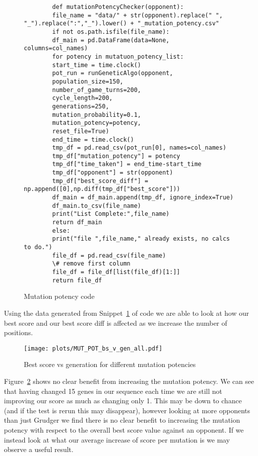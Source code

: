 \begin{figure}
    \begin{verbatim}
        def mutationPotencyChecker(opponent):
        file_name = "data/" + str(opponent).replace(" ", "_").replace(":","_").lower() + "_mutation_potency.csv"
        if not os.path.isfile(file_name):
        df_main = pd.DataFrame(data=None, columns=col_names)
        for potency in mutatuon_potency_list:
        start_time = time.clock()
        pot_run = runGeneticAlgo(opponent,
        population_size=150,
        number_of_game_turns=200,
        cycle_length=200,
        generations=250,
        mutation_probability=0.1,
        mutation_potency=potency,
        reset_file=True)
        end_time = time.clock()
        tmp_df = pd.read_csv(pot_run[0], names=col_names)
        tmp_df["mutation_potency"] = potency
        tmp_df["time_taken"] = end_time-start_time
        tmp_df["opponent"] = str(opponent)
        tmp_df["best_score_diff"] = np.append([0],np.diff(tmp_df["best_score"]))
        df_main = df_main.append(tmp_df, ignore_index=True)
        df_main.to_csv(file_name)
        print("List Complete:",file_name)
        return df_main
        else:
        print("file ",file_name," already exists, no calcs to do.")
        file_df = pd.read_csv(file_name)
        \# remove first column
        file_df = file_df[list(file_df)[1:]]
        return file_df
    \end{verbatim}
    \caption{Mutation potency code}\label{code:mutationPotencyChecker}
\end{figure}

Using the data generated from Snippet~\ref{code:mutationPotencyChecker} of code we are able to look at how our best score and our best score diff is affected as we increase the number of positions.\\

\begin{figure}[h]
    \texttt{[image: plots/MUT\_POT\_bs\_v\_gen\_all.pdf]}
    \caption{Best score vs generation for different mutation potencies}\label{fig:MUT-POT-bs-v-gen-all}
\end{figure}

Figure~\ref{fig:MUT-POT-bs-v-gen-all} shows no clear benefit from increasing the mutation potency.
We can see that having changed 15 genes in our sequence each time we are still not improving our score as much as changing only 1.
This may be down to chance (and if the test is rerun this may disappear), however looking at more opponents than just Grudger we find there is no clear benefit to increasing the mutation potency with respect to the overall best score value against an opponent.
If we instead look at what our average increase of score per mutation is we may observe a useful result.\\

